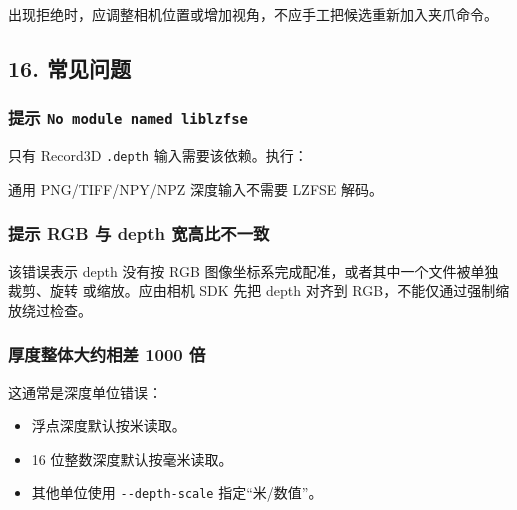 \documentclass[
  chinese,
  11pt,
  a4paper,
]{article}
\newenvironment{Shaded}{\begin{snugshade}}{\end{snugshade}}
\newcommand{\AttributeTok}[1]{\textcolor[rgb]{0.13,0.29,0.53}{#1}}
\newcommand{\NormalTok}[1]{#1}
\newcommand{\StringTok}[1]{\textcolor[rgb]{0.31,0.60,0.02}{#1}}
\newcommand{\VariableTok}[1]{\textcolor[rgb]{0.00,0.00,0.00}{#1}}
\providecommand{\tightlist}{%
  \setlength{\itemsep}{0pt}\setlength{\parskip}{0pt}}
\begin{document}
出现拒绝时，应调整相机位置或增加视角，不应手工把候选重新加入夹爪命令。

\subsection{16. 常见问题}\label{16-ux5e38ux89c1ux95eeux9898}

\subsubsection{\texorpdfstring{提示
\texttt{No\ module\ named\ \textquotesingle{}liblzfse\textquotesingle{}}}{提示 No module named \textquotesingle liblzfse\textquotesingle{}}}\label{ux63d0ux793a-no-module-named-liblzfse}

只有 Record3D \texttt{.depth} 输入需要该依赖。执行：

\begin{Shaded}
\end{Shaded}

通用 PNG/TIFF/NPY/NPZ 深度输入不需要 LZFSE 解码。

\subsubsection{提示 RGB 与 depth
宽高比不一致}\label{ux63d0ux793a-rgb-ux4e0e-depth-ux5bbdux9ad8ux6bd4ux4e0dux4e00ux81f4}

该错误表示 depth 没有按 RGB
图像坐标系完成配准，或者其中一个文件被单独裁剪、旋转 或缩放。应由相机
SDK 先把 depth 对齐到 RGB，不能仅通过强制缩放绕过检查。

\subsubsection{厚度整体大约相差 1000
倍}\label{ux539aux5ea6ux6574ux4f53ux5927ux7ea6ux76f8ux5dee-1000-ux500d}

这通常是深度单位错误：

\begin{itemize}
\tightlist
\item
  浮点深度默认按米读取。
\item
  16 位整数深度默认按毫米读取。
\item
  其他单位使用 \texttt{-\/-depth-scale} 指定``米/数值''。
\end{itemize}
\end{document}

